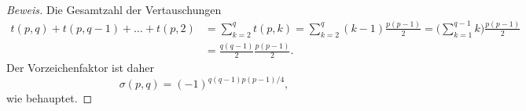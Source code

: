 \begin{proof}[Beweis]
Die Gesamtzahl der Vertauschungen
\begin{align*}
t(p,q) + t(p,q-1) + \dots + t(p,2)
&=
\sum_{k=2}^q t(p,k)
=
\sum_{k=2}^q (k-1)\frac{p(p-1)}2
=
\biggl(\sum_{k=1}^{q-1} k\biggr) \frac{p(p-1)}2
\\
&=
\frac{q(q-1)}{2}\frac{p(p-1)}2.
\end{align*}
Der Vorzeichenfaktor ist daher
\[
\sigma(p,q)
=
(-1)^{q(q-1)p(p-1)/4},
\]
wie behauptet.
\qedhere
\end{proof}

